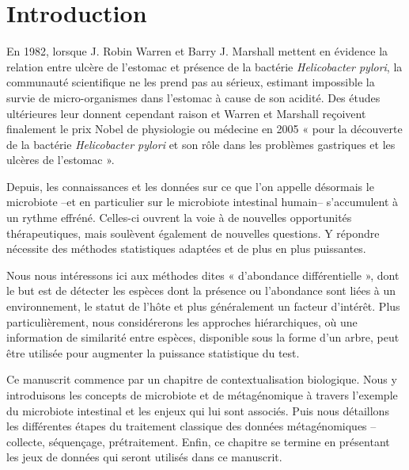 \documentclass[12pt,a4paper]{reedthesis}
\theoremstyle{definition}
\theoremstyle{definition}
\theoremstyle{definition}
\theoremstyle{remark}
\begin{document}
  \hypersetup{linkcolor=black}
  \setcounter{tocdepth}{2}
  \tableofcontents

  \listoftables

  \listoffigures



\mainmatter %
\pagestyle{fancyplain} %

\hypertarget{introduction}{%
\chapter*{Introduction}\label{introduction}}

En 1982, lorsque J. Robin Warren et Barry J. Marshall mettent en évidence la relation entre ulcère de l'estomac et présence de la bactérie \emph{Helicobacter pylori}, la communauté scientifique ne les prend pas au sérieux, estimant impossible la survie de micro-organismes dans l'estomac à cause de son acidité. Des études ultérieures leur donnent cependant raison et Warren et Marshall reçoivent finalement le prix Nobel de physiologie ou médecine en 2005 « pour la découverte de la bactérie \emph{Helicobacter pylori} et son rôle dans les problèmes gastriques et les ulcères de l'estomac ».

Depuis, les connaissances et les données sur ce que l'on appelle désormais le microbiote --et en particulier sur le microbiote intestinal humain-- s'accumulent à un rythme effréné. Celles-ci ouvrent la voie à de nouvelles opportunités thérapeutiques, mais soulèvent également de nouvelles questions. Y répondre nécessite des méthodes statistiques adaptées et de plus en plus puissantes.

Nous nous intéressons ici aux méthodes dites « d'abondance différentielle », dont le but est de détecter les espèces dont la présence ou l'abondance sont liées à un environnement, le statut de l'hôte et plus généralement un facteur d'intérêt. Plus particulièrement, nous considérerons les approches hiérarchiques, où une information de similarité entre espèces, disponible sous la forme d'un arbre, peut être utilisée pour augmenter la puissance statistique du test.

Ce manuscrit commence par un chapitre de contextualisation biologique. Nous y introduisons les concepts de microbiote et de métagénomique à travers l'exemple du microbiote intestinal et les enjeux qui lui sont associés. Puis nous détaillons les différentes étapes du traitement classique des données métagénomiques --collecte, séquençage, prétraitement. Enfin, ce chapitre se termine en présentant les jeux de données qui seront utilisés dans ce manuscrit.
\end{document}

